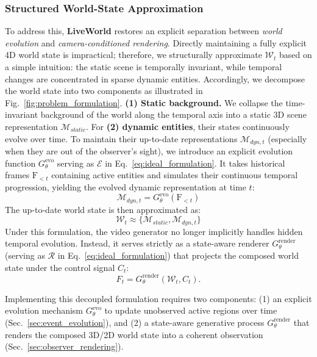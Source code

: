 \subsubsection{Structured World-State Approximation}
To address this, \textbf{LiveWorld} restores an explicit separation between \textit{world evolution} and \textit{camera-conditioned rendering}. Directly maintaining a fully explicit 4D world state is impractical; therefore, we structurally approximate $\mathcal{W}_{t}$ based on a simple intuition: the static scene is temporally invariant, while temporal changes are concentrated in sparse dynamic entities.
Accordingly, we decompose the world state into two components as illustrated in Fig.~\ref{fig:problem_formulation}. \textbf{(1) Static background.} We collapse the time-invariant background of the world along the temporal axis into a static 3D scene representation $\mathcal{M}_{static}$. For \textbf{(2) dynamic entities}, their states continuously evolve over time. To maintain their up-to-date representations $\mathcal{M}_{dyn,t}$ (especially when they are out of the observer's sight), we introduce an explicit evolution function $G_{\theta}^{\text{evo}}$ serving as $\mathcal{E}$ in Eq.~\ref{eq:ideal_formulation}. It takes historical frames $\text{F}_{<t}$ containing active entities and simulates their continuous temporal progression, yielding the evolved dynamic representation at time $t$:
\vspace{-1mm}
\begin{equation}
    \mathcal{M}_{dyn,t} = G_{\theta}^{\text{evo}}(\text{F}_{<t})
    \label{eq4:dynamic_memory}
\end{equation}
\vspace{-1mm}
The up-to-date world state is then approximated as:
\begin{equation}
    \mathcal{W}_{t} \approx \{\mathcal{M}_{static}, \mathcal{M}_{dyn,t}\}
    \label{eq:world_state}
\end{equation}
Under this formulation, the video generator no longer implicitly handles hidden temporal evolution. Instead, it serves strictly as a state-aware renderer $G_{\theta}^{\text{render}}$ (serving as $\mathcal{R}$ in Eq.~\ref{eq:ideal_formulation}) that projects the composed world state under the control signal $C_t$:
\begin{equation}
    F_t = G_{\theta}^{\text{render}}(\mathcal{W}_{t}, C_t).
    \label{eq5:our_formulation}
\end{equation}

Implementing this decoupled formulation requires two components: (1) an explicit evolution mechanism $G_{\theta}^{\text{evo}}$ to update unobserved active regions over time (Sec.~\ref{sec:event_evolution}), and (2) a state-aware generative process $G_{\theta}^{\text{render}}$ that renders the composed 3D/2D world state into a coherent observation (Sec.~\ref{sec:observer_rendering}).




